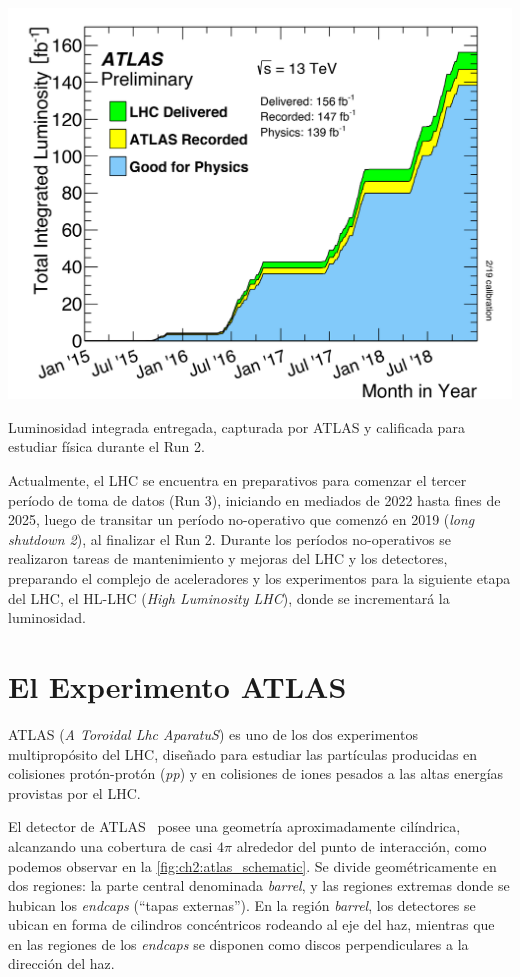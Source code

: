 \begin{marginfigure}
    \includegraphics[width=\linewidth]{Assets/Plots/Lumi_ATLAS.pdf}
    \caption{Luminosidad integrada entregada, capturada por ATLAS y calificada para estudiar física durante el Run 2.}
    \label{fig:ch2:lhc_atlas_luminosity}
\end{marginfigure}

Actualmente, el LHC se encuentra en preparativos para comenzar el tercer período de toma de datos (Run 3), iniciando en mediados de 2022 hasta fines de 2025, luego de transitar un período no-operativo que comenzó en 2019 (\textit{long shutdown 2}), al finalizar el Run 2. Durante los períodos no-operativos se realizaron tareas de mantenimiento y mejoras del LHC y los detectores, preparando el complejo de aceleradores y los experimentos para la siguiente etapa del LHC, el HL-LHC (\textit{High Luminosity LHC}), donde se incrementará la luminosidad.





\section{El Experimento ATLAS}

ATLAS (\textit{A Toroidal Lhc AparatuS}) es uno de los dos experimentos multipropósito del LHC, diseñado para estudiar las partículas producidas en colisiones protón-protón (\textit{pp}) y en colisiones de iones pesados a las altas energías provistas por el LHC. 

El detector de ATLAS~\cite{Aad2008} posee una geometría aproximadamente cilíndrica, alcanzando una cobertura de casi $4\pi$ alrededor del punto de interacción, como podemos observar en la \cref{fig:ch2:atlas_schematic}. Se divide geométricamente en dos regiones: la parte central denominada \textit{barrel}, y las regiones extremas donde se hubican los \textit{endcaps} (``tapas externas''). En la región \textit{barrel}, los detectores se ubican en forma de cilindros concéntricos rodeando al eje del haz, mientras que en las regiones de los \textit{endcaps} se disponen como discos perpendiculares a la dirección del haz. 


